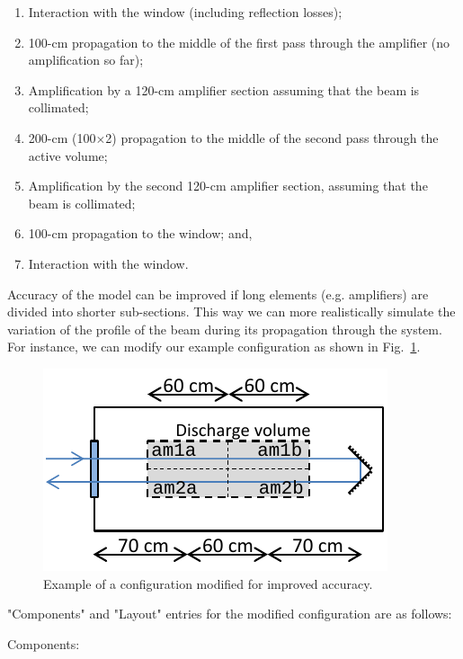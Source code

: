 \documentclass{report}
\begin{document}
\begin{enumerate}
\item Interaction with the window (including reflection losses);
\item 100-cm propagation to the middle of the first pass through the amplifier (no amplification so far);
\item Amplification by a 120-cm amplifier section assuming that the beam is collimated;
\item 200-cm (100$\times$2) propagation to the middle of the second pass through the active volume;
\item Amplification by the second 120-cm amplifier section, assuming that the beam is collimated;
\item 100-cm propagation to the window; and,
\item Interaction with the window.
\end{enumerate}

Accuracy of the model can be improved if long elements (e.g. amplifiers) are divided into shorter sub-sections. This way we can more realistically simulate the variation of the profile of the beam during its propagation through the system. For instance, we can modify our example configuration as shown in Fig.~\ref{fig:optical-configuration-2}.

\begin{figure}[ht]
\centering
\includegraphics{images/optical-configuration-2}
\caption{Example of a configuration modified for improved accuracy.}\label{fig:optical-configuration-2}
\end{figure}
 
"Components" and "Layout" entries for the modified configuration are as follows:

\bigskip
Components:\nopagebreak
\end{document}
